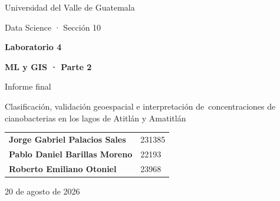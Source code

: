 \documentclass[11pt,letterpaper]{article}
\begin{document}
\begin{titlepage}
\pagecolor{navy}\color{white}
\vspace*{1.1cm}
{\Large Universidad del Valle de Guatemala\par}
\vspace{0.25cm}
{\large Data Science · Sección 10\par}
\vfill
{\Huge\bfseries Laboratorio 4\par}
\vspace{0.25cm}
{\Huge\bfseries ML y GIS · Parte 2\par}
\vspace{0.65cm}
{\LARGE Informe final\par}
\vspace{0.8cm}
{\large Clasificación, validación geoespacial e interpretación de\
concentraciones de cianobacterias en los lagos de Atitlán y Amatitlán\par}
\vfill
\begin{tabular}{@{}ll@{}}
\textbf{Jorge Gabriel Palacios Sales} & 231385\\[4pt]
\textbf{Pablo Daniel Barillas Moreno} & 22193\\[4pt]
\textbf{Roberto Emiliano Otoniel} & 23968
\end{tabular}
\vfill
{\large 20 de agosto de 2026\par}
\end{titlepage}
\nopagecolor\color{black}

\begin{abstract}
Se construyó un conjunto supervisado a nivel píxel--fecha con 22 observaciones Sentinel-2 L2A de los lagos de Atitlán y Amatitlán. Después de recortar los GeoJSON oficiales, filtrar calidad, identificar agua y calcular los índices de la Parte 1, quedaron 3,419,056 píxeles válidos; para modelado se tomó una muestra reproducible y balanceada por lago--fecha de 220,000 filas. La respuesta binaria identifica valores del proxy Se2WaQ iguales o superiores a 100,000 células/mL. Para evitar fuga se excluyeron CYA, B02, B03, B04, NDVI y NDWI. Se compararon regresión logística, Random Forest y Gradient Boosting con prueba aleatoria 70/30, GroupKFold espacial, retención temporal y transferencia entre lagos. Gradient Boosting obtuvo ROC-AUC 0.9987 y F1 0.9572 en la prueba aleatoria, pero F1 0.6651 en la fecha futura; la regresión logística conservó el mayor recall temporal (0.9384). SHAP atribuyó el mayor efecto a B05 y B08. Los mapas estrictamente fuera de muestra muestran riesgo casi nulo en la última escena de Atitlán y focos localizados en Amatitlán, donde el modelo subestima la extensión de un régimen de floración no visto durante el entrenamiento. Los resultados respaldan el uso del modelo como herramienta de priorización, no como sustituto de mediciones limnológicas o sanitarias in situ.
\end{abstract}
\end{document}

